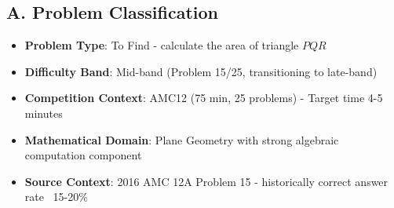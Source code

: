 \documentclass[]{article}
\begin{document}
\begin{problemconfigbox}
\subsection*{A. Problem Classification}
\begin{itemize}[leftmargin=*]
    \item \textbf{Problem Type}: To Find - calculate the area of triangle $PQR$
    \item \textbf{Difficulty Band}: Mid-band (Problem 15/25, transitioning to late-band)
    \item \textbf{Competition Context}: AMC12 (75 min, 25 problems) - Target time 4-5 minutes
    \item \textbf{Mathematical Domain}: Plane Geometry with strong algebraic computation component
    \item \textbf{Source Context}: 2016 AMC 12A Problem 15 - historically correct answer rate ~15-20\%
\end{itemize}


\end{problemconfigbox}
\end{document}
